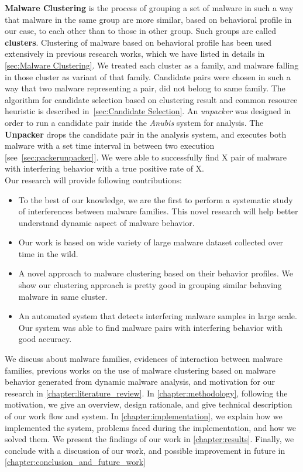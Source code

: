 \textbf{Malware Clustering} is the process of grouping a set of malware in such a way that malware in the same group are more similar, based on behavioral profile in our case, to each other than to those in other group.
Such groups are called \textbf{clusters}.
Clustering of malware based on behavioral profile has been used extensively in previous research works, which we have listed in details in \autoref{sec:Malware Clustering}.
We treated each cluster as a family, and malware falling in those cluster as variant of that family.
Candidate pairs were chosen in such a way that two malware representing a pair, did not belong to same family.
The algorithm for candidate selection based on clustering result and common resource heuristic is described in~\autoref{sec:Candidate Selection}.
An \emph{unpacker} was designed in order to run a candidate pair inside the \emph{Anubis} system for analysis.
The \textbf{Unpacker} drops the candidate pair in the analysis system, and executes both malware with a set time interval in between two execution [see~\autoref{sec:packerunpacker}].
We were able to successfully find X pair of malware with interfering behavior with a true positive rate of X.\\

Our research will provide following contributions:
\begin{itemize}
  \item To the best of our knowledge, we are the first to perform a systematic study of interferences between malware families.
    This novel research will help better understand dynamic aspect of malware behavior.
  \item Our work is based on wide variety of large malware dataset collected over time in the wild.
  \item A novel approach to malware clustering based on their behavior profiles.
    We show our clustering approach is pretty good in grouping similar behaving malware in same cluster.
  \item An automated system that detects interfering malware samples in large scale.
  Our system was able to find malware pairs with interfering behavior with good accuracy.
\end{itemize}
We discuss about malware families, evidences of interaction between malware families, previous works on the use of malware clustering based on malware behavior generated from dynamic malware analysis, and motivation for our research in \autoref{chapter:literature_review}.
In \autoref{chapter:methodology}, following the motivation, we give an overview, design rationale, and give technical description of our work flow and system.
In \autoref{chapter:implementation}, we explain how we implemented the system, problems faced during the implementation, and how we solved them.
We present the findings of our work in \autoref{chapter:results}.
Finally, we conclude with a discussion of our work, and possible improvement in future in \autoref{chapter:conclusion_and_future_work}
